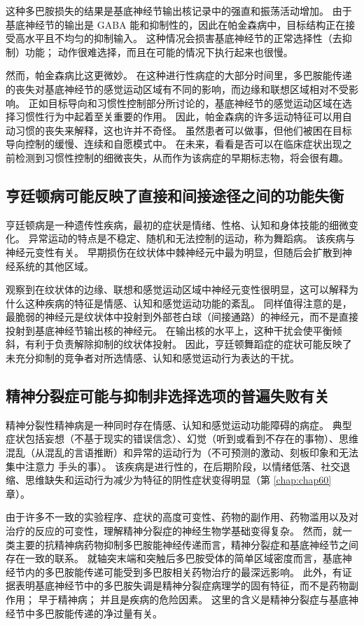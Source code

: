 这种多巴胺损失的结果是基底神经节输出核记录中的强直和振荡活动增加。 由于基底神经节的输出是 GABA 能和抑制性的，因此在帕金森病中，目标结构正在接受高水平且不均匀的抑制输入。 这种情况会损害基底神经节的正常选择性（去抑制）功能； 动作很难选择，而且在可能的情况下执行起来也很慢。

然而，帕金森病比这更微妙。 在这种进行性病症的大部分时间里，多巴胺能传递的丧失对基底神经节的感觉运动区域有不同的影响，而边缘和联想区域相对不受影响。 正如目标导向和习惯性控制部分所讨论的，基底神经节的感觉运动区域在选择习惯性行为中起着至关重要的作用。 因此，帕金森病的许多运动特征可以用自动习惯的丧失来解释，这也许并不奇怪。 虽然患者可以做事，但他们被困在目标导向控制的缓慢、连续和自愿模式中。 在未来，看看是否可以在临床症状出现之前检测到习惯性控制的细微丧失，从而作为该病症的早期标志物，将会很有趣。

\subsection{亨廷顿病可能反映了直接和间接途径之间的功能失衡}
亨廷顿病是一种遗传性疾病，最初的症状是情绪、性格、认知和身体技能的细微变化。 异常运动的特点是不稳定、随机和无法控制的运动，称为舞蹈病。 该疾病与神经元变性有关。 早期损伤在纹状体中棘神经元中最为明显，但随后会扩散到神经系统的其他区域。

观察到在纹状体的边缘、联想和感觉运动区域中神经元变性很明显，这可以解释为什么这种疾病的特征是情感、认知和感觉运动功能的紊乱。 同样值得注意的是，最脆弱的神经元是纹状体中投射到外部苍白球（间接通路）的神经元，而不是直接投射到基底神经节输出核的神经元。 在输出核的水平上，这种干扰会使平衡倾斜，有利于负责解除抑制的纹状体投射。 因此，亨廷顿舞蹈症的症状可能反映了未充分抑制的竞争者对所选情感、认知和感觉运动行为表达的干扰。


\subsection{精神分裂症可能与抑制非选择选项的普遍失败有关}
精神分裂性精神病是一种同时存在情感、认知和感觉运动功能障碍的病症。 典型症状包括妄想（不基于现实的错误信念）、幻觉（听到或看到不存在的事物）、思维混乱（从混乱的言语推断）和异常的运动行为（不可预测的激动、刻板印象和无法集中注意力 手头的事）。 该疾病是进行性的，在后期阶段，以情绪低落、社交退缩、思维缺失和运动行为减少为特征的阴性症状变得明显（第 \ref{chap:chap60} 章）。

由于许多不一致的实验程序、症状的高度可变性、药物的副作用、药物滥用以及对治疗的反应的可变性，理解精神分裂症的神经生物学基础变得复杂。 然而，就一类主要的抗精神病药物抑制多巴胺能神经传递而言，精神分裂症和基底神经节之间存在一致的联系。 就轴突末端和突触后多巴胺受体的简单区域密度而言，基底神经节内的多巴胺能传递可能受到多巴胺相关药物治疗的最深远影响。 此外，有证据表明基底神经节中的多巴胺失调是精神分裂症病理学的固有特征，而不是药物副作用； 早于精神病； 并且是疾病的危险因素。 这里的含义是精神分裂症与基底神经节中多巴胺能传递的净过量有关。

